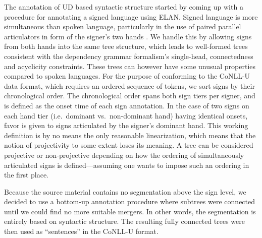\documentclass[11pt]{article}
\begin{document}
The annotation of UD based syntactic structure started by coming up with a
procedure for annotating a signed language using ELAN. Signed language is more
simultaneous than spoken language, particularly in the use of paired parallel
articulators in form of the signer's two hands
\cite{Vermeerbergen2007simultaneity}.  We handle this by allowing signs from
both hands into the same tree structure, which leads to well-formed trees
consistent with the dependency grammar formalism's single-head, connectedness
and acyclicity constraints.  These trees can however have some unusual
properties compared to spoken languages.  For the purpose of conforming to the
CoNLL-U data format, which requires an ordered sequence of tokens, we sort
signs by their chronological order. The chronological order spans both sign
tiers per signer, and is defined as the onset time of each sign annotation. In
the case of two signs on each hand tier (i.e.~dominant vs.~non-dominant hand)
having identical onsets, favor is given to signs articulated by the signer's
dominant hand.  This working definition is by no means the only reasonable
linearization, which means that the notion of projectivity to some extent
loses its meaning.  A tree can be considered projective or non-projective
depending on how the ordering of simultaneously articulated signs is
defined---assuming one wants to impose such an ordering in the first place.

Because the source material contains no segmentation above the sign level,
we decided to use a bottom-up annotation procedure where subtrees were
connected until we could find no more suitable mergers. In other words,
the segmentation is entirely based on syntactic structure. The resulting fully
connected trees were then used as ``sentences'' in the CoNLL-U format.
\end{document}
